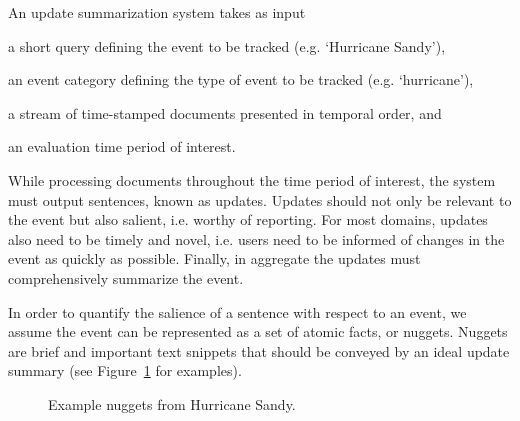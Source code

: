 
An update summarization system takes as input 
\begin{enumerate*}[label=\itshape\alph*\upshape)]
  \item a short query defining the event to be tracked (e.g. `Hurricane Sandy'), 
  \item an event category defining the type of event to be tracked (e.g. `hurricane'), 
  \item a stream of time-stamped documents %
  presented in temporal order, and \item an evaluation time period of interest.
      \end{enumerate*} While processing documents
      throughout the time period of interest, the system must output sentences,
      known as updates.
      Updates should not only be relevant to the event but also salient,
      i.e. worthy of
      reporting.
      For most domains, updates also need to be 
      timely and novel, i.e. users need to be informed of changes in the 
      event as quickly as possible.
      Finally, in aggregate the updates must comprehensively summarize the 
      event.

In order to quantify the salience of a sentence with respect to an event,
we assume the event can be represented as a set of atomic facts, or nuggets.
Nuggets are brief and important text snippets that should be conveyed
by an ideal update summary (see Figure~\ref{fig:nuggets} for examples).
\setlength{\fboxsep}{10pt}
\begin{figure}
 \caption{Example nuggets from Hurricane Sandy.\label{fig:nuggets}}
\end{figure}


